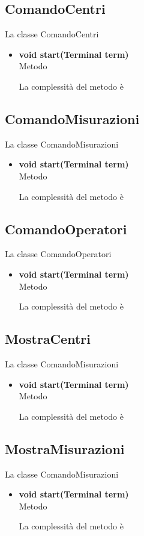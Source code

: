 \documentclass[a4paper, 12pt]{scrreprt}
\begin{document}
			\subsection{ComandoCentri}
			La classe ComandoCentri
			\begin{itemize}
				\item \textbf{void start(Terminal term)}
				\\Metodo
				
				La complessit\`a del metodo è
				
			\end{itemize}
			\subsection{ComandoMisurazioni}
			La classe ComandoMisurazioni
			\begin{itemize}
				\item \textbf{void start(Terminal term)}
				\\Metodo
				
				La complessit\`a del metodo è 
				
			\end{itemize}
			\subsection{ComandoOperatori}
			La classe ComandoOperatori
			\begin{itemize}
				\item \textbf{void start(Terminal term)}
				\\Metodo
				
				La complessit\`a del metodo è 
				
			\end{itemize}
			\subsection{MostraCentri}
			La classe ComandoMisurazioni
			\begin{itemize}
				\item \textbf{void start(Terminal term)}
				\\Metodo
				
				La complessit\`a del metodo è 
				
			\end{itemize}
			
			\subsection{MostraMisurazioni}
			La classe ComandoMisurazioni
			\begin{itemize}
				\item \textbf{void start(Terminal term)}
				\\Metodo
				
				La complessit\`a del metodo è 
				
			\end{itemize}
\end{document}
